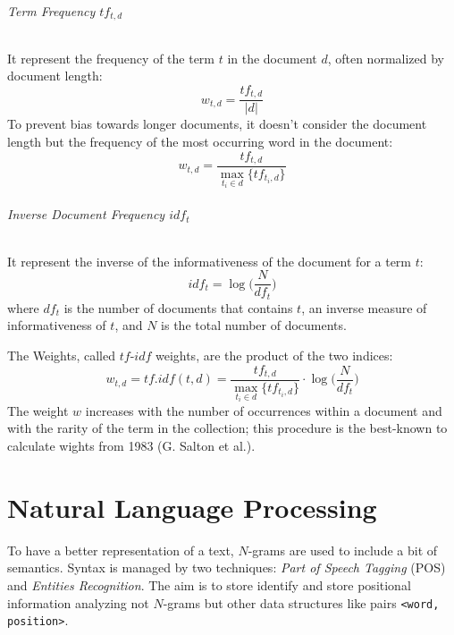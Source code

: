 \documentclass[11pt, a4page]{article}
\begin{document}
\paragraph{Term Frequency $tf_{t, d}$} It represent the frequency of the term $t$ in the document $d$, often normalized by document length:
\begin{equation*}
  w_{t, d} = \frac{tf_{t, d}}{|d|}
\end{equation*}
To prevent bias towards longer documents, it doesn't consider the document length but the frequency of the most occurring word in the document:
\begin{equation*}
  w_{t, d} = \frac{tf_{t, d}}{\displaystyle \max_{t_i \in d} \{tf_{t_i, d}\}}
\end{equation*}

\paragraph{Inverse Document Frequency $idf_t$} It represent the inverse of the informativeness of the document for a term $t$:
\begin{equation*}
  idf_t = \log \Big( \frac{N}{df_t} \Big)
\end{equation*}
where $df_t$ is the number of documents that contains $t$, an inverse measure of informativeness of $t$, and $N$ is the total number of documents.
\newline

The Weights, called $tf$-$idf$ weights, are the product of the two indices:
\begin{equation*}
  w_{t, d} = tf.idf(t, d) = \frac{tf_{t, d}}{\displaystyle \max_{t_i \in d} \{ tf_{t_i, d} \}} \cdot \log \Big(\frac{N}{df_t} \Big)
\end{equation*}
The weight $w$ increases with the number of occurrences within a document and with the rarity of the term in the collection; this procedure is the best-known to calculate wights from 1983 (G. Salton et al.).
\newpage

\part{Natural Language Processing}
To have a better representation of a text, $N$-grams are used to include a bit of semantics.
Syntax is managed by two techniques: \textit{Part of Speech Tagging} (POS) and \textit{Entities Recognition}.
The aim is to store identify and store positional information analyzing not $N$-grams but other data structures like pairs \verb|<word, position>|.
\end{document}
